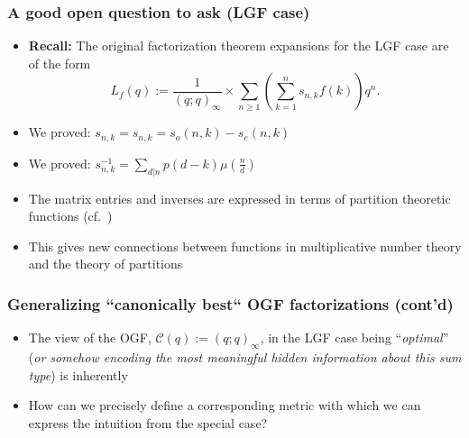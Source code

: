 \begin{frame}
\frametitle{A good open question to ask (LGF case)}
\begin{itemize} 

\item \textbf{Recall:} The original factorization theorem expansions for the LGF case are 
      of the form 
      \[
      L_f(q) := \frac{1}{(q; q)_{\infty}} \times \sum_{n \geq 1} \left( 
           \sum_{k=1}^{n} s_{n,k} f(k)\right) q^n. 
      \]
\pause\item We proved: $s_{n,k} = s_{n,k} = s_o(n, k) - s_e(n, k)$
\pause\item We proved: $s^{-1}_{n,k} = \sum\limits_{d|n} p(d-k) \mu\left(\frac{n}{d}\right)$ 
\pause\item The matrix entries and inverses are expressed in terms of partition theoretic functions 
      (cf.~\cite{ANDREWS}) 
\pause\item This gives new connections between functions in multiplicative number theory and 
      the theory of partitions 

\end{itemize}

\end{frame}

\begin{frame}
\frametitle{Generalizing ``canonically best`` OGF factorizations (cont'd)}
\begin{itemize} 

\item The view of the OGF, $\mathcal{C}(q) := (q; q)_{\infty}$, in the LGF case being 
      ``\emph{optimal}'' (\textit{or somehow encoding the most meaningful hidden information about this sum type}) 
      is inherently 
\pause\item How can we precisely define a corresponding  metric 
      with which we can express the intuition from the special case?

\end{itemize}

\end{frame}

